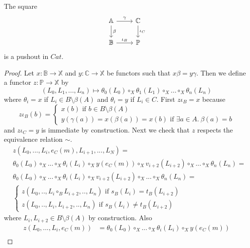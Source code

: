 \documentclass{article}
\begin{document}
\begin{lemma}
	The square
	\begin{equation*}
		\begin{tikzcd}
			\mathbb{A} \rar{\gamma} \dar{\beta} &\mathbb{C} \dar{\iota_C}\\
			\mathbb{B} \rar{\iota_B} & \mathbb{P}
		\end{tikzcd}
	\end{equation*}
	is a pushout in $Cat$.
	\begin{proof}
		Let $x:\mathbb{B}\rightarrow \mathbb{X}$ and $y:\mathbb{C}\rightarrow \mathbb{X}$ be functors such that $x\beta = y\gamma$.
		Then we define a functor $z:\mathbb{P}\rightarrow \mathbb{X}$ by
		\begin{equation*}
			(L_0,L_1,...,L_n)\mapsto \theta_0(L_0)\circ_X\theta_1(L_1)\circ_X ...\circ_X\theta_n(L_n)
		\end{equation*}
		where $\theta_i = x$ if $L_i\in B\setminus \beta(A)$ and $\theta_i=y$ if $L_i\in C$.
		First $z\iota_B=x$ because
		\begin{equation*}
			z\iota_B(b) =
			\begin{cases}
				x(b) \text{ if } b\in B\setminus \beta(A)\\
				y(\gamma (a)) = x(\beta(a)) = x(b) \text{ if } \exists a\in A.~\beta(a)=b
			\end{cases}
		\end{equation*}
		and $z\iota_C = y$ is immediate by construction.
		Next we check that $z$ respects the equivalence relation $\sim$.
		\begin{align*}
			&z(L_0,...,L_i,e_C(m),L_{i+1},...,L_N)=\\
			&\theta_0(L_0)\circ_X...\circ_X\theta_i(L_i)\circ_X y(e_C(m)) \circ_X v_{i+2}(L_{i+2}) \circ_X ... \circ_X \theta_n(L_n)=\\
			&\theta_0(L_0)\circ_X...\circ_X\theta_i(L_i)\circ_X v_{i+2}(L_{i+2}) \circ_X ... \circ_X \theta_n(L_n)=\\
			&\begin{cases}
				z(L_0,..,L_i\circ_B L_{i+2},..,L_n)\text{ if }s_B(L_i)=t_B(L_{i+2})\\
				z(L_0,..,L_i, L_{i+2},..,L_n)\text{ if }s_B(L_i)\neq t_B(L_{i+2})
			\end{cases}
		\end{align*}
		where $L_i,L_{i+2}\in B\setminus \beta(A)$ by construction.
		Also
		\begin{align*}
			z(L_0,...,L_i,e_C(m)) &= \theta_0(L_0)\circ_X ... \circ_X\theta_i(L_i)\circ_X y(e_C(m))\\

\end{align*}
\end{proof}
\end{lemma}
\end{document}
